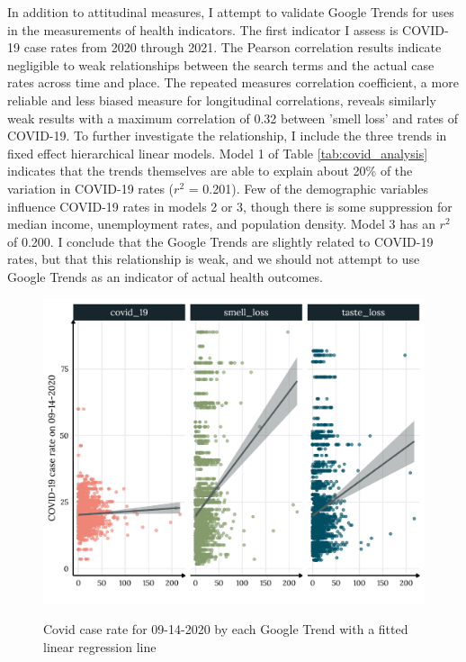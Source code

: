 In addition to attitudinal measures, I attempt to validate Google Trends for
uses in the measurements of health indicators. The first indicator I assess is
COVID-19 case rates from 2020 through 2021. The Pearson correlation results
indicate negligible to weak relationships between the search terms and the
actual case rates across time and place. The repeated measures correlation
coefficient, a more reliable and less biased measure for longitudinal
correlations, reveals similarly weak results with a maximum correlation of 0.32
between 'smell loss' and rates of COVID-19. To further investigate the
relationship, I include the three trends in fixed effect hierarchical linear
models. Model 1 of Table \ref{tab:covid_analysis} indicates that the trends
themselves are able to explain about 20\% of the variation in COVID-19 rates
($r^2$ = 0.201). Few of the demographic variables influence COVID-19 rates in
models 2 or 3, though there is some suppression for median income, unemployment
rates, and population density. Model 3 has an $r^2$ of 0.200. I conclude that
the Google Trends are slightly related to COVID-19 rates, but that this
relationship is weak, and we should not attempt to use Google Trends as an
indicator of actual health outcomes.


\begin{figure}[h]
{\centering \includegraphics[width=0.8\linewidth]{figs/paper1/covid_plot-1.pdf}}
\caption{Covid case rate for 09-14-2020 by each Google Trend with a fitted linear regression line}\label{fig:covid_plot-1}
\end{figure}

